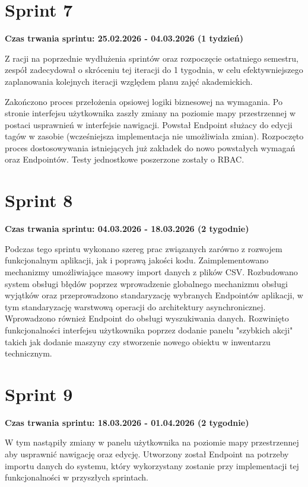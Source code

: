\section{Sprint 7}
\textbf{Czas trwania \Gls{sprint}u: 25.02.2026 - 04.03.2026 (1 tydzień)}
\par
Z racji na poprzednie wydłużenia \gls{sprint}ów oraz rozpoczęcie ostatniego semestru, zespół zadecydował o skróceniu tej iteracji do 1 tygodnia, w celu efektywniejszego zaplanowania kolejnych iteracji względem planu zajęć akademickich.
\par
Zakończono proces przełożenia opsiowej logiki biznesowej na wymagania.
Po stronie interfejsu użytkownika zaszły zmiany na poziomie mapy przestrzennej w postaci usprawnień w interfejsie nawigacji.
Powstał \gls{Endpoint} służacy do edycji tagów w zasobie (wcześniejsza implementacja nie umożliwiała zmian).
Rozpoczęto proces dostosowywania istniejących już zakładek do nowo powstałych wymagań oraz \gls{Endpoint}ów.
Testy jednostkowe poszerzone zostały o \gls{RBAC}.

\section{Sprint 8}
\textbf{Czas trwania \Gls{sprint}u: 04.03.2026 - 18.03.2026 (2 tygodnie)}
\par
Podczas tego \gls{sprint}u wykonano szereg prac związanych zarówno z rozwojem funkcjonalnym aplikacji, jak i poprawą jakości kodu. 
Zaimplementowano mechanizmy umożliwiające masowy import danych z plików \gls{CSV}.
Rozbudowano system obsługi błędów poprzez wprowadzenie globalnego mechanizmu obsługi wyjątków oraz przeprowadzono standaryzację wybranych \gls{Endpoint}ów aplikacji, w tym standaryzację warstwową operacji do architektury asynchronicznej.
Wprowadzono również \gls{Endpoint} do obsługi wyszukiwania danych.
Rozwinięto funkcjonalności interfejsu użytkownika poprzez dodanie panelu "szybkich akcji" takich jak dodanie maszyny czy stworzenie nowego obiektu w inwentarzu technicznym.

\section{Sprint 9}
\textbf{Czas trwania \Gls{sprint}u: 18.03.2026 - 01.04.2026 (2 tygodnie)}
\par
W tym  nastąpiły zmiany w panelu użytkownika na poziomie mapy przestrzennej aby usprawnić nawigację oraz edycję.
Utworzony został \gls{Endpoint} na potrzeby importu danych do systemu, który wykorzystany zostanie przy implementacji tej funkcjonalności w przyszłych \gls{sprint}ach.


